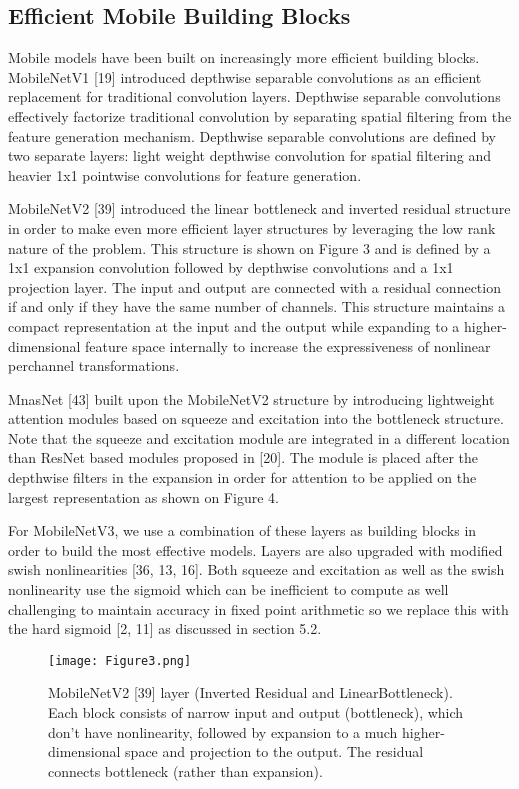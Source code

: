 \subsection{Efficient Mobile Building Blocks}

Mobile models have been built on increasingly more efficient building blocks. MobileNetV1 [19] introduced depthwise
separable convolutions as an efficient replacement for traditional convolution layers. Depthwise separable convolutions
effectively factorize traditional convolution by separating spatial filtering from the feature generation mechanism.
Depthwise separable convolutions are defined by two separate layers: light weight depthwise convolution for
spatial filtering and heavier 1x1 pointwise convolutions for feature generation.

MobileNetV2 [39] introduced the linear bottleneck and inverted residual structure in order to make even more efficient
layer structures by leveraging the low rank nature of the problem. This structure is shown on Figure 3 and is
defined by a 1x1 expansion convolution followed by depthwise convolutions and a 1x1 projection layer. The input and
output are connected with a residual connection if and only if they have the same number of channels. This structure
maintains a compact representation at the input and the output while expanding to a higher-dimensional feature space
internally to increase the expressiveness of nonlinear perchannel transformations.

MnasNet [43] built upon the MobileNetV2 structure by introducing lightweight attention modules based on squeeze
and excitation into the bottleneck structure. Note that the squeeze and excitation module are integrated in a different
location than ResNet based modules proposed in [20]. The module is placed after the depthwise filters in the expansion
in order for attention to be applied on the largest representation as shown on Figure 4.

For MobileNetV3, we use a combination of these layers as building blocks in order to build the most effective models.
Layers are also upgraded with modified swish nonlinearities [36, 13, 16]. Both squeeze and excitation as well as
the swish nonlinearity use the sigmoid which can be inefficient to compute as well challenging to maintain accuracy
in fixed point arithmetic so we replace this with the hard sigmoid [2, 11] as discussed in section 5.2.

\begin{figure}[!htbp]
    \centering
    \texttt{[image: Figure3.png]}
    \caption{MobileNetV2 [39] layer (Inverted Residual and LinearBottleneck). Each block consists of narrow input and output (bottleneck),
    which don’t have nonlinearity, followed by expansion to a much higher-dimensional space and projection to the output. The
    residual connects bottleneck (rather than expansion).}
\end{figure}


